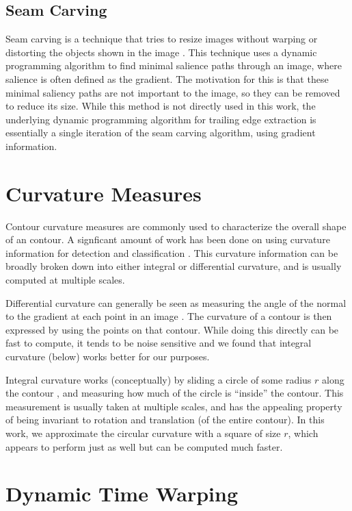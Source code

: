 \subsection{Seam Carving}

Seam carving is a technique that tries to resize images without warping or distorting the objects shown in the image \cite{Avidan:2007:SCC:1276377.1276390}.
This technique uses a dynamic programming algorithm to find minimal salience paths through an image, where salience is often defined as the gradient.
The motivation for this is that these minimal saliency paths are not important to the image, so they can be removed to reduce its size.
While this method is not directly used in this work, the underlying dynamic programming algorithm for trailing edge extraction is essentially a single iteration of the seam carving algorithm, using gradient information.

\section{Curvature Measures}

Contour curvature measures are commonly used to characterize the overall shape of an contour. 
A signficant amount of work has been done on using curvature information for detection \cite{monroy2011beyond} and classification \cite{fischer2014image, kumar2012leafsnap}. 
This curvature information can be broadly broken down into either integral or differential curvature, and is usually computed at multiple scales.

Differential curvature can generally be seen as measuring the angle of the normal to the gradient at each point in an image \cite{fischer2014image}.
The curvature of a contour is then expressed by using the points on that contour.
While doing this directly can be fast to compute, it tends to be noise sensitive and we found that integral curvature (below) works better for our purposes.

Integral curvature works (conceptually) by sliding a circle of some radius $r$ along the contour \cite{pottmann2007integral}, and measuring how much of the circle is ``inside'' the contour.
This measurement is usually taken at multiple scales, and has the appealing property of being invariant to rotation and translation (of the entire contour).
In this work, we approximate the circular curvature with a square of size $r$, which appears to perform just as well but can be computed much faster.

\section{Dynamic Time Warping}

